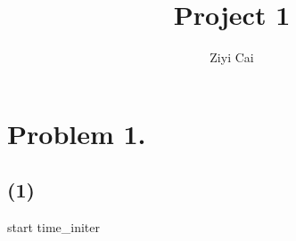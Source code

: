 \documentclass{article}
\title{Project 1}
\author{Ziyi Cai}
\begin{document}
\maketitle
\section*{Problem 1.}
\subsection*{(1)}
start
time\_initer
\end{document}
